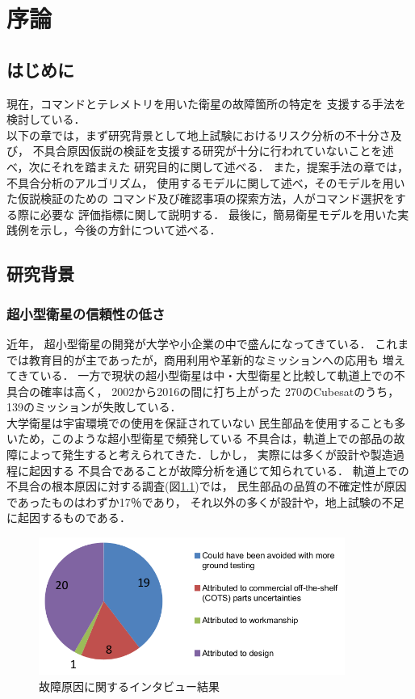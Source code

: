 \documentclass[11pt]{jsreport}
\begin{document}
\fi

\chapter{序論}
\section{はじめに}
現在，コマンドとテレメトリを用いた衛星の故障箇所の特定を
支援する手法を検討している．\\
以下の章では，まず研究背景として地上試験におけるリスク分析の不十分さ及び，
不具合原因仮説の検証を支援する研究が十分に行われていないことを述べ，次にそれを踏まえた
研究目的に関して述べる．
また，提案手法の章では，不具合分析のアルゴリズム，
使用するモデルに関して述べ，そのモデルを用いた仮説検証のための
コマンド及び確認事項の探索方法，人がコマンド選択をする際に必要な
評価指標に関して説明する．
最後に，簡易衛星モデルを用いた実践例を示し，今後の方針について述べる．

\section{研究背景} 
\subsection{超小型衛星の信頼性の低さ}
近年，
超小型衛星の開発が大学や小企業の中で盛んになってきている．
これまでは教育目的が主であったが，商用利用や革新的なミッションへの応用も
増えてきている\cite{Langer2016}．
一方で現状の超小型衛星は中・大型衛星と比較して軌道上での不具合の確率は高く，
2002から2016の間に打ち上がった
270のCubesatのうち，139のミッションが失敗している\cite{Langer2016}．\\
大学衛星は宇宙環境での使用を保証されていない
民生部品を使用することも多いため，このような超小型衛星で頻発している
不具合は，軌道上での部品の故障によって発生すると考えられてきた．しかし，
実際には多くが設計や製造過程に起因する
不具合であることが故障分析を通じて知られている\cite{Venturini2017}．
軌道上での不具合の根本原因に対する調査(図\ref{fig:cause of failure})では，
民生部品の品質の不確定性が原因であったものはわずか17％であり，
それ以外の多くが設計や，地上試験の不足に起因するものである\cite{Venturini2017}．

\begin{figure}[H]
   \centering
      \includegraphics[height=4.5cm]{figure/cause_of_failure.png}
      \caption{故障原因に関するインタビュー結果\cite{Venturini2017}}
      \label{fig:cause of failure}
\end{figure}
\end{document}
